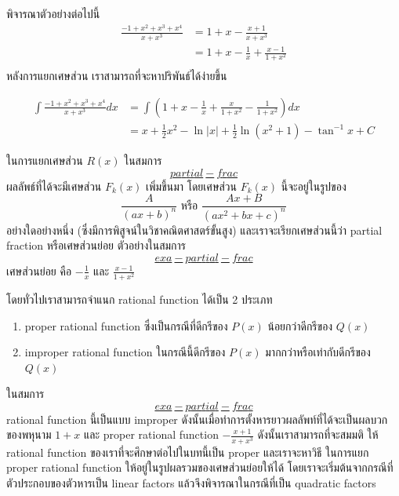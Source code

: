 \documentclass[
]{book}
\theoremstyle{definition}
\theoremstyle{definition}
\theoremstyle{definition}
\theoremstyle{definition}
\theoremstyle{remark}
\begin{document}
พิจารณาตัวอย่างต่อไปนี้ \[\label{exa-partial-frac}
     \begin{split}
        \frac{-1+x^2+x^3+x^4}{x + x^3} &= 1 +x - \frac{x+1}{x + x^3}  \\
                                       &= 1 +x -\frac{1}{x} + \frac{x-1}{1+x^2} \\
     \end{split}\] หลังการแยกเศษส่วน เราสามารถที่จะหาปริพันธ์ได้ง่ายขึ้น
 

\[\begin{aligned}
        \int \frac{-1+x^2+x^3+x^4}{x + x^3}dx &= \int\left(1 +x -\frac{1}{x} + \frac{x}{1+x^2} -\frac{1}{1+x^2}\right)dx \\   
            &=x + \frac{1}{2}x^2 - \ln|x| +\frac{1}{2}\ln(x^2+1) -\tan^{-1}x + C
\end{aligned}\]

 

ในการแยกเศษส่วน \(R(x)\) ในสมการ
\hyperref[partial-frac]{\[partial-frac\]} ผลลัพธ์ที่ได้จะมีเศษส่วน \(F_k(x)\) เพิ่มขึ้นมา โดยเศษส่วน
\(F_k(x)\) นี้จะอยู่ในรูปของ \[\label{partial-frac-1}
     \frac{A}{(ax + b)^n} \text{ หรือ } \frac{Ax + B}{(ax^2 + bx +c)^n}\]
อย่างใดอย่างหนึ่ง (ซึ่งมีการพิสูจน์ในวิชาคณิตศาสตร์ขั้นสูง) และเราจะเรียกเศษส่วนนี้ว่า
partial fraction หรือเศษส่วนย่อย ตัวอย่างในสมการ
\hyperref[exa-partial-frac]{\[exa-partial-frac\]} เศษส่วนย่อย คือ \(-\frac{1}{x}\) และ
\(\frac{x-1}{1+x^2}\)

โดยทั่วไปเราสามารถจำแนก rational function ได้เป็น 2 ประเภท

\begin{enumerate}
\def\labelenumi{\arabic{enumi}.}
\item
  proper rational function ซึ่งเป็นกรณีที่ดีกรีของ \(P(x)\) น้อยกว่าดีกรีของ \(Q(x)\)
\item
  improper rational function ในกรณีนี้ดีกรีของ \(P(x)\) มากกว่าหรือเท่ากับดีกรีของ
  \(Q(x)\)
\end{enumerate}

ในสมการ \hyperref[exa-partial-frac]{\[exa-partial-frac\]} rational function นี้เป็นแบบ improper
ดังนั้นเมื่อทำการตั้งหารยาวผลลัพท์ที่ได้จะเป็นผลบวกของพหุนาม \(1 +x\) และ proper
rational function \(- \frac{x+1}{x + x^3}\) ดังนั้นเราสามารถที่จะสมมติ ให้
rational function ของเราที่จะศึกษาต่อไปในบทนี้เป็น proper และเราจะหาวิธี ในการแยก
proper rational function ให้อยู่ในรูปผลรวมของเศษส่วนย่อยให้ได้
โดยเราจะเริ่มต้นจากกรณีที่ตัวประกอบของตัวหารเป็น linear factors
แล้วจึงพิจารณาในกรณีที่เป็น quadratic factors
\end{document}
